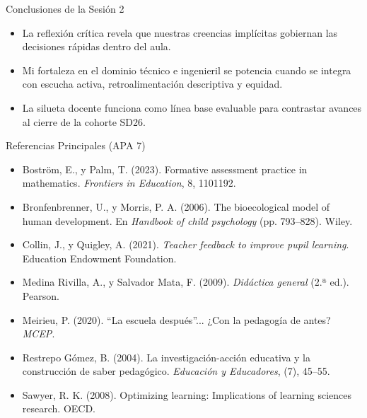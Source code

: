 \documentclass[aspectratio=169,spanish,xcolor=table]{beamer}
\begin{document}
\begin{frame}{Conclusiones de la Sesión 2}
  \begin{itemize}\normalsize
    \item La reflexión crítica revela que nuestras creencias implícitas gobiernan las decisiones rápidas dentro del aula.
    \item Mi fortaleza en el dominio técnico e ingenieril se potencia cuando se integra con escucha activa, retroalimentación descriptiva y equidad.
    \item La silueta docente funciona como línea base evaluable para contrastar avances al cierre de la cohorte SD26.
  \end{itemize}
\end{frame}

\begin{frame}{Referencias Principales (APA 7)}
  \scriptsize\setlength{\parskip}{5pt}
  \begin{itemize}
    \item Boström, E., y Palm, T. (2023). Formative assessment practice in mathematics. \textit{Frontiers in Education}, 8, 1101192.
    \item Bronfenbrenner, U., y Morris, P. A. (2006). The bioecological model of human development. En \textit{Handbook of child psychology} (pp. 793--828). Wiley.
    \item Collin, J., y Quigley, A. (2021). \textit{Teacher feedback to improve pupil learning}. Education Endowment Foundation.
    \item Medina Rivilla, A., y Salvador Mata, F. (2009). \textit{Didáctica general} (2.ª ed.). Pearson.
    \item Meirieu, P. (2020). ``La escuela después''... ¿Con la pedagogía de antes? \textit{MCEP}.
    \item Restrepo Gómez, B. (2004). La investigación-acción educativa y la construcción de saber pedagógico. \textit{Educación y Educadores}, (7), 45--55.
    \item Sawyer, R. K. (2008). Optimizing learning: Implications of learning sciences research. OECD.
  \end{itemize}
\end{frame}
\end{document}
